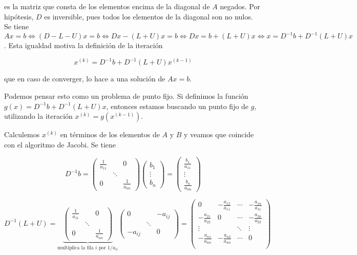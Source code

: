 es la matriz que consta de los elementos encima de la diagonal de $A$ negados. Por hipótesis, $D$ es inversible, pues todos los elementos de la diagonal son no nulos. Se tiene $Ax = b \Leftrightarrow (D - L - U)x = b \Leftrightarrow Dx - (L + U)x = b \Leftrightarrow Dx = b + (L + U)x \Leftrightarrow x = D^{-1}b + D^{-1}(L + U)x$. Esta igualdad motiva la definición de la iteración

\[x^{(k)} = D^{-1}b + D^{-1}(L + U)x^{(k - 1)}\]

que en caso de converger, lo hace a una solución de $Ax = b$.

\begin{obs}
Podemos pensar esto como un problema de punto fijo. Si definimos la función $g(x) = D^{-1}b + D^{-1}(L + U)x$, entonces estamos buscando un punto fijo de $g$, utilizando la iteración $x^{(k)} = g(x^{(k - 1)})$. 
\end{obs}

Calculemos $x^{(k)}$ en términos de los elementos de $A$ y $B$ y veamos que coincide con el algoritmo de Jacobi. Se tiene

\[D^{-1}b = \begin{pmatrix}
\frac{1}{a_{11}} 	& 			& 0	\\
		& \ddots		& 	\\
0		&			& \frac{1}{a_{nn}}\end{pmatrix}
\begin{pmatrix}
b_1 \\ \vdots \\ b_n
\end{pmatrix} = \begin{pmatrix}
\frac{b_1}{a_{11}} \\ \vdots \\ \frac{b_n}{a_{nn}}
\end{pmatrix}\]

\[D^{-1}(L + U) = \underbrace{
\begin{pmatrix}
\frac{1}{a_{11}} 	& 			& 0	\\
		& \ddots		& 	\\
0		&			& \frac{1}{a_{nn}}\end{pmatrix}
}_{\text{multiplica la fila } i \text{ por } 1/a_{ii}}
\begin{pmatrix}
0	 	& 			& -a_{ij}	\\
		& \ddots		& 	\\
-a_{ij}		&			& 0\end{pmatrix} =
\begin{pmatrix}
0 & -\frac{a_{12}}{a_{11}} & \cdots & -\frac{a_{1n}}{a_{11}}\\
-\frac{a_{21}}{a_{22}} & 0 & \cdots & -\frac{a_{2n}}{a_{22}}\\
\vdots & & \ddots & \vdots\\
-\frac{a_{n1}}{a_{nn}} & -\frac{a_{n2}}{a_{nn}} & \cdots & 0\\
\end{pmatrix}
\]

